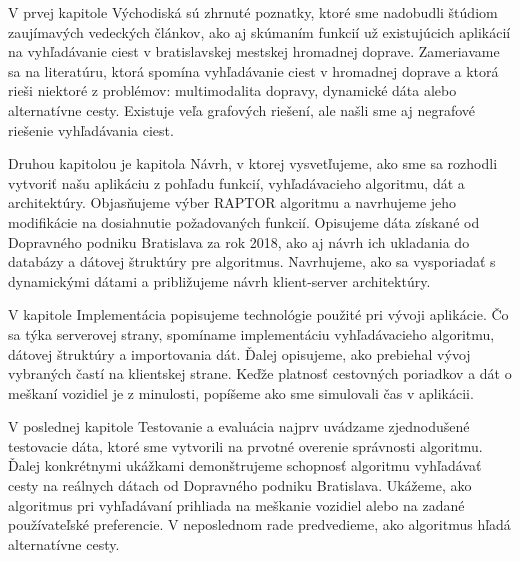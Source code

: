 V prvej kapitole Východiská sú zhrnuté poznatky, ktoré sme nadobudli štúdiom zaujímavých vedeckých článkov, ako aj skúmaním funkcií už existujúcich aplikácií na vyhľadávanie ciest v bratislavskej mestskej hromadnej doprave. Zameriavame sa na literatúru, ktorá spomína vyhľadávanie ciest v hromadnej doprave a ktorá rieši niektoré z problémov: multimodalita dopravy, dynamické dáta alebo alternatívne cesty. Existuje veľa grafových riešení, ale našli sme aj negrafové riešenie vyhľadávania ciest. 

Druhou kapitolou je kapitola Návrh, v ktorej vysvetľujeme, ako sme sa rozhodli vytvoriť našu aplikáciu z pohľadu funkcií, vyhľadávacieho algoritmu, dát a architektúry. Objasňujeme výber RAPTOR algoritmu a navrhujeme jeho modifikácie na dosiahnutie požadovaných funkcií. Opisujeme dáta získané od Dopravného podniku Bratislava za rok 2018, ako aj návrh ich ukladania do databázy a dátovej štruktúry pre algoritmus. Navrhujeme, ako sa vysporiadať s dynamickými dátami a približujeme návrh klient-server architektúry.

V kapitole Implementácia popisujeme technológie použité pri vývoji aplikácie. Čo sa týka serverovej strany, spomíname implementáciu vyhľadávacieho algoritmu, dátovej štruktúry a importovania dát. Ďalej opisujeme, ako prebiehal vývoj vybraných častí na klientskej strane. Keďže platnosť cestovných poriadkov a dát o meškaní vozidiel je z minulosti, popíšeme ako sme simulovali čas v aplikácii. 

V poslednej kapitole Testovanie a evaluácia najprv uvádzame zjednodušené testovacie dáta, ktoré sme vytvorili na prvotné overenie správnosti algoritmu. Ďalej konkrétnymi ukážkami demonštrujeme schopnosť algoritmu vyhľadávať cesty na reálnych dátach od Dopravného podniku Bratislava. Ukážeme, ako algoritmus pri vyhľadávaní prihliada na meškanie vozidiel alebo na zadané používateľské preferencie. V neposlednom rade predvedieme, ako algoritmus hľadá alternatívne cesty. 


